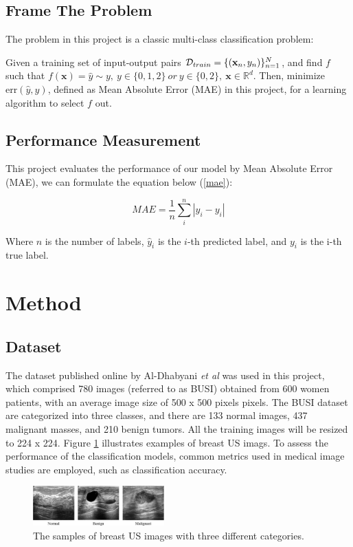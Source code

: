 \documentclass[final,5p,times,twocolumn,sort&compress]{elsarticle}
\begin{document}
\subsection{Frame The Problem}
The problem in this project is a classic multi-class classification problem:

Given a training set of input-output pairs ${\cal D}_{train} = \{({\mathbf x_n}, y_n)\}_{n=1}^{N}$, and find $f$ such that $f(\mathbf{x})=\hat{y}\sim y,\ y\in\{0,1,2\}\ or\ y\in\{0,2\},\ {\mathbf x} \in \mathbb{R}^{d}$. Then, minimize $\text{err}(\hat{y}, y)$, defined as Mean Absolute Error (MAE) in this project, for a learning algorithm to select $f$ out.

\subsection{Performance Measurement}
This project evaluates the performance of our model by Mean Absolute Error (MAE), we can formulate the equation below (\ref{mae}):

\begin{equation}
    \label{mae}
    MAE=\frac{1}{n}\sum_{i}^{n}|\hat{y}_{i}-y_{i}|
\end{equation}

Where $n$ is the number of labels, $\hat{y}_{i}$ is the $i$-th predicted label, and $y_{i}$ is the i-th true label.

\section{Method}
\subsection{Dataset}
The dataset published online by Al-Dhabyani \emph{et al} \cite{ALDHABYANI2020104863} was used in this project, which comprised 780 images (referred to as BUSI) obtained from 600 women patients, with an average image size of 500 x 500 pixels pixels. The BUSI dataset are categorized into three classes, and there are 133 normal images, 437 malignant masses, and 210 benign tumors. All the training images will be resized to 224 x 224. Figure \ref{fig:BUSI} illustrates examples of breast US imags. To assess the performance of the classification models, common metrics used in medical image studies are employed, such as classification accuracy.

\begin{figure}[H]
    \centering
    \includegraphics[width=0.45\textwidth]{./img/figure_1.jpg}
    \caption{The samples of breast US images with three different categories.}
    \label{fig:BUSI}
\end{figure}
\end{document}
